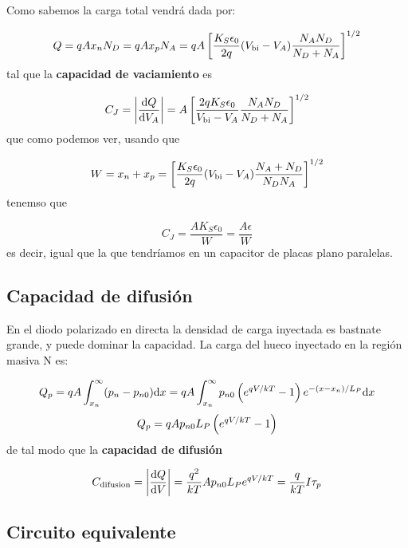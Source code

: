 Como sabemos la carga total vendrá dada por: 

\begin{equation}
    Q = q A x_n N_D = q A x_p N_A = q A \left[ \frac{K_S \epsilon_0}{2q} (V_{\text{bi}}-V_A) \frac{N_AN_D}{N_D+N_A} \right]^{1/2}
\end{equation}
tal que la \textbf{capacidad de vaciamiento} es

\begin{equation}
    C_J = \abs{\frac{\mathrm{d} Q}{\mathrm{d} V_A}} = A \left[ \frac{2qK_S \epsilon_0}{V_{\text{bi}}-V_A} \frac{N_AN_D}{N_D+N_A} \right]^{1/2} 
\end{equation}
que como podemos ver, usando que

\begin{equation}
    W = x_n + x_p = \left[ \frac{K_S \epsilon_0}{2q} (V_{\text{bi}}-V_A) \frac{N_A+N_D}{N_DN_A} \right]^{1/2}
\end{equation}
tenemso que 

\begin{equation}
    C_J = \frac{AK_S\epsilon_0}{W} = \frac{A\epsilon}{W}
\end{equation}
es decir, igual que la que tendríamos en un capacitor de placas plano paralelas. 
\subsection{Capacidad de difusión}

En el diodo polarizado en directa la densidad de carga inyectada es bastnate grande, y puede dominar la capacidad. La carga del hueco inyectado en la región masiva N es: 

\begin{equation}
    Q_p = qA  \int_{x_n}^{\infty} (p_n-p_{n0} )\mathrm{d} x =  q A \int_{x_n}^{\infty} p_{n0} \left( e^{qV/kT}-1 \right) e^{-(x-x_n)/L_P} \mathrm{d} x 
\end{equation}
\begin{equation}
    Q_p = q A p_{n0} L_P  \left( e^{qV/kT}-1 \right)  
\end{equation}
de tal modo que la \textbf{capacidad de difusión}

\begin{equation}
    C_{\text{difusion}} = \abs{\frac{\mathrm{d} Q}{\mathrm{d} V}} =  \frac{q^2}{kT}A p_{n0} L_P  e^{qV/kT} = \frac{q}{kT} I \tau_p
\end{equation}

\subsection{Circuito equivalente}

